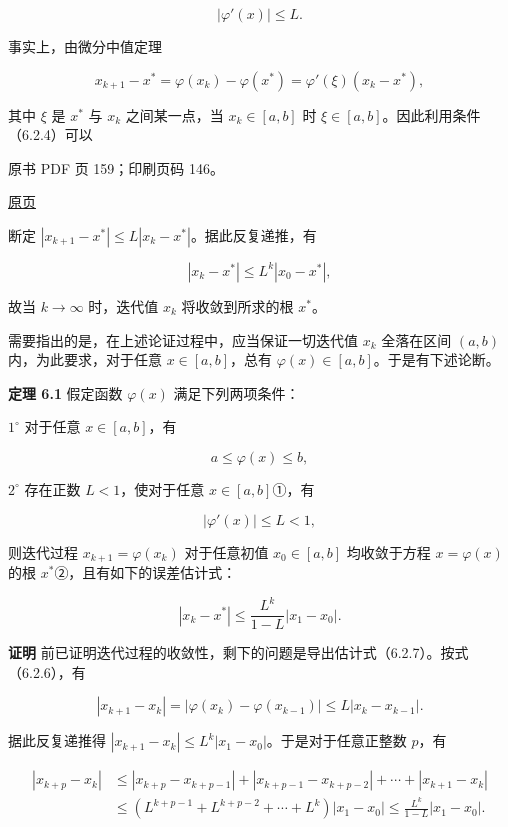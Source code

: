 \[
|\varphi'(x)|\leqslant L.
\tag{6.2.4}
\]

事实上，由微分中值定理

\[
x_{k+1}-x^*=\varphi(x_k)-\varphi(x^*)=\varphi'(\xi)(x_k-x^*),
\]

其中 \(\xi\) 是 \(x^*\) 与 \(x_k\) 之间某一点，当 \(x_k\in[a,b]\) 时 \(\xi\in[a,b]\)。因此利用条件（6.2.4）可以

\clearpage

原书 PDF 页 159；印刷页码 146。

\href{source-images/pdf-159.jpeg}{原页}

断定 \(|x_{k+1}-x^*|\leqslant L|x_k-x^*|\)。据此反复递推，有

\[
|x_k-x^*|\leqslant L^k|x_0-x^*|,
\]

故当 \(k\to\infty\) 时，迭代值 \(x_k\) 将收敛到所求的根 \(x^*\)。

需要指出的是，在上述论证过程中，应当保证一切迭代值 \(x_k\) 全落在区间 \((a,b)\) 内，为此要求，对于任意 \(x\in[a,b]\)，总有 \(\varphi(x)\in[a,b]\)。于是有下述论断。

\textbf{定理 6.1} 假定函数 \(\varphi(x)\) 满足下列两项条件：

\(1^\circ\) 对于任意 \(x\in[a,b]\)，有

\[
a\leqslant\varphi(x)\leqslant b,
\tag{6.2.5}
\]

\(2^\circ\) 存在正数 \(L<1\)，使对于任意 \(x\in[a,b]\)①，有

\[
|\varphi'(x)|\leqslant L<1,
\tag{6.2.6}
\]

则迭代过程 \(x_{k+1}=\varphi(x_k)\) 对于任意初值 \(x_0\in[a,b]\) 均收敛于方程 \(x=\varphi(x)\) 的根 \(x^*\)②，且有如下的误差估计式：

\[
|x_k-x^*|\leqslant\frac{L^k}{1-L}|x_1-x_0|.
\tag{6.2.7}
\]

\textbf{证明} 前已证明迭代过程的收敛性，剩下的问题是导出估计式（6.2.7）。按式（6.2.6），有

\[
|x_{k+1}-x_k|=|\varphi(x_k)-\varphi(x_{k-1})|\leqslant L|x_k-x_{k-1}|.
\tag{6.2.8}
\]

据此反复递推得 \(|x_{k+1}-x_k|\leqslant L^k|x_1-x_0|\)。于是对于任意正整数 \(p\)，有

\[
\begin{aligned}
|x_{k+p}-x_k|&\leqslant|x_{k+p}-x_{k+p-1}|+|x_{k+p-1}-x_{k+p-2}|+\cdots+|x_{k+1}-x_k|\\
&\leqslant(L^{k+p-1}+L^{k+p-2}+\cdots+L^k)|x_1-x_0|\leqslant\frac{L^k}{1-L}|x_1-x_0|.
\end{aligned}
\]

